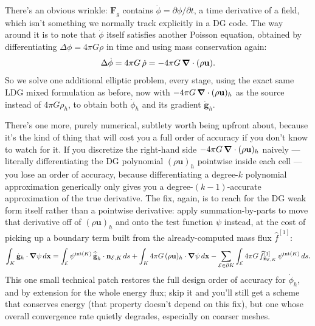 There's an obvious wrinkle: $\mathbf{F}_g$ contains $\dot\phi = \partial\phi/\partial t$, a time derivative of a field, which isn't something we normally track explicitly in a DG code. The way around it is to note that $\dot\phi$ itself satisfies another Poisson equation, obtained by differentiating $\Delta\phi = 4\pi G\rho$ in time and using mass conservation again:
\[
	\Delta\dot\phi = 4\pi G\,\dot\rho = -4\pi G\,\grad\cdot(\rho\mathbf{u}).
\]
So we solve one additional elliptic problem, every stage, using the exact same LDG mixed formulation as before, now with $-4\pi G\,\grad\cdot(\rho\mathbf{u})_h$ as the source instead of $4\pi G\rho_h$, to obtain both $\dot\phi_h$ and its gradient $\dot{\mathbf{g}}_h$.

There's one more, purely numerical, subtlety worth being upfront about, because it's the kind of thing that will cost you a full order of accuracy if you don't know to watch for it. If you discretize the right-hand side $-4\pi G\,\grad\cdot(\rho\mathbf{u})_h$ naively — literally differentiating the DG polynomial $(\rho\mathbf{u})_h$ pointwise inside each cell — you lose an order of accuracy, because differentiating a degree-$k$ polynomial approximation generically only gives you a degree-$(k-1)$-accurate approximation of the true derivative. The fix, again, is to reach for the DG weak form itself rather than a pointwise derivative: apply summation-by-parts to move that derivative off of $(\rho\mathbf{u})_h$ and onto the test function $\psi$ instead, at the cost of picking up a boundary term built from the already-computed mass flux $\widehat{f}^{[1]}$:
\[
	\int_K \dot{\mathbf{g}}_h\cdot\grad\psi\, d\mathbf{x} = \int_{\mathcal{E}} \psi^{\mathrm{int}(K)}\,\widehat{\dot{\mathbf{g}}}_h\cdot\mathbf{n}_{\mathcal{E},K}\, ds + \int_K 4\pi G\,(\rho\mathbf{u})_h\cdot\grad\psi\, d\mathbf{x} - \sum_{\mathcal{E}\in\partial K}\int_{\mathcal{E}} 4\pi G\, \widehat{f}^{[1]}_{\mathbf{n}_{\mathcal{E},K}}\, \psi^{\mathrm{int}(K)}\, ds.
\]
This one small technical patch restores the full design order of accuracy for $\dot\phi_h$, and by extension for the whole energy flux; skip it and you'll still get a scheme that conserves energy (that property doesn't depend on this fix), but one whose overall convergence rate quietly degrades, especially on coarser meshes.

